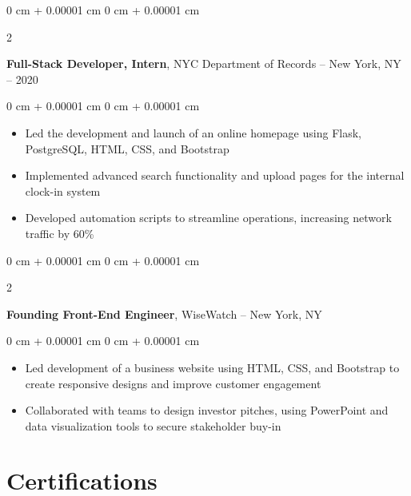 \documentclass[10pt, letterpaper]{article}
\newenvironment{highlights}{
    \begin{itemize}[
        topsep=0.10 cm,
        parsep=0.10 cm,
        partopsep=0pt,
        itemsep=0pt,
        leftmargin=0 cm + 10pt
    ]
}{
    \end{itemize}
} %
\newenvironment{onecolentry}{
    \begin{adjustwidth}{
        0 cm + 0.00001 cm
    }{
        0 cm + 0.00001 cm
    }
}{
    \end{adjustwidth}
} %
\newenvironment{twocolentry}[2][]{
    \onecolentry
    \def\secondColumn{#2}
    \setcolumnwidth{\fill, 4.5 cm}
    \begin{paracol}{2}
}{
    \switchcolumn \raggedleft \secondColumn
    \end{paracol}
    \endonecolentry
} %
\begin{document}
        \begin{twocolentry}{
            2019 -- 2020
        }
            \textbf{Full-Stack Developer, Intern}, NYC Department of Records -- New York, NY\end{twocolentry}

        \vspace{0.10 cm}
        \begin{onecolentry}
            \begin{highlights}
                \item Led the development and launch of an online homepage using Flask, PostgreSQL, HTML, CSS, and Bootstrap
                \item Implemented advanced search functionality and upload pages for the internal clock-in system
                \item Developed automation scripts to streamline operations, increasing network traffic by 60\%
            \end{highlights}
        \end{onecolentry}


        \vspace{0.35 cm}

        \begin{twocolentry}{
            2019
        }
            \textbf{Founding Front-End Engineer}, WiseWatch -- New York, NY\end{twocolentry}

        \vspace{0.10 cm}
        \begin{onecolentry}
            \begin{highlights}
                \item Led development of a business website using HTML, CSS, and Bootstrap to create responsive designs and improve customer engagement
                \item Collaborated with teams to design investor pitches, using PowerPoint and data visualization tools to secure stakeholder buy-in
            \end{highlights}
        \end{onecolentry}


    \vspace{.3 cm}
    
    \section{Certifications}
\end{document}
